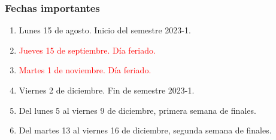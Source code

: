 \documentclass[12pt]{beamer}
\begin{document}
\begin{frame}
\frametitle{Fechas importantes}
\begin{enumerate}[<+->]
\item Lunes 15 de agosto. Inicio del semestre 2023-1.
\item \textcolor{red}{Jueves 15 de septiembre. Día feriado.}
\item \textcolor{red}{Martes 1 de noviembre. Día feriado.}
\item Viernes 2 de diciembre. Fin de semestre 2023-1.
\item Del lunes 5 al viernes 9 de diciembre, primera semana de finales.
\item Del martes 13 al viernes 16 de diciembre, segunda semana de finales.
\end{enumerate}
\end{frame}
\end{document}
